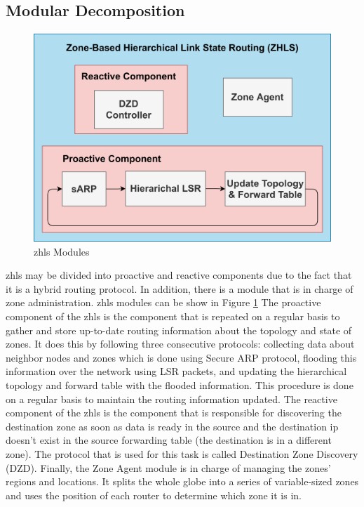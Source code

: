 \subsection{Modular Decomposition}

\begin{figure}[!htb]
    \centering
    \includegraphics[width=\linewidth]{images/zhls-modules.png}
    \caption{\acrshort{zhls} Modules}
    \label{fig:zhls-modules}
\end{figure}

\acrfull{zhls} may be divided into proactive and reactive components due to the fact that it is a hybrid routing protocol. In addition, there is a module that is in charge of zone administration. \acrshort{zhls} modules can be show in Figure  \ref{fig:zhls-modules} 
The proactive component of the \acrshort{zhls} is the component that is repeated on a regular basis to gather and store up-to-date routing information about the topology and state of zones. It does this by following three consecutive protocols: collecting data about neighbor nodes and zones which is done using Secure ARP protocol, flooding this information over the network using LSR packets, and updating the hierarchical topology and forward table with the flooded information. This procedure is done on a regular basis to maintain the routing information updated. 
The reactive component of the \acrshort{zhls} is the component that is responsible for discovering the destination zone as soon as data is ready in the source and the destination \acrshort{ip} doesn't exist in the source forwarding table (the destination is in a different zone). The protocol that is used for this task is called Destination Zone Discovery (DZD). 
Finally, the Zone Agent module is in charge of managing the zones' regions and locations. It splits the whole globe into a series of variable-sized zones and uses the position of each router to determine which zone it is in.

